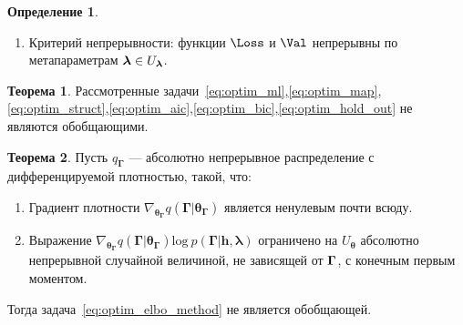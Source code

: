 \documentclass[11pt, a5paper]{dissert}
\theoremstyle{definition}
\newtheorem{theorem}{Теорема}
\newtheorem{defin}{Определение}
\begin{document}
{\begin{defin}
\begin{enumerate}
\item Критерий непрерывности: функции $\Loss$ и $\Val$ непрерывны по метапараметрам $\boldsymbol{\lambda} \in U_{\boldsymbol{\lambda}}$.
\end{enumerate}
\end{defin}

\begin{theorem}Рассмотренные задачи~\eqref{eq:optim_ml},\eqref{eq:optim_map},\eqref{eq:optim_struct},\eqref{eq:optim_aic},\eqref{eq:optim_bic},\eqref{eq:optim_hold_out} не являются обобщающими.
\end{theorem}

\begin{theorem}
Пусть $q_{\boldsymbol{\Gamma}}$ --- абсолютно непрерывное распределение с дифференцируемой плотностью, такой, что:
\begin{enumerate}
\item Градиент плотности $\nabla_{\boldsymbol{\theta}_{\boldsymbol{\Gamma}}} q(\boldsymbol{\Gamma}|\boldsymbol{\theta}_{\boldsymbol{\Gamma}})$ является ненулевым почти всюду.
\item Выражение $\nabla_{\boldsymbol{\theta}_{\boldsymbol{\Gamma}}} q(\boldsymbol{\Gamma}|\boldsymbol{\theta}_{\boldsymbol{\Gamma}}) \text{log}~p(\boldsymbol{\Gamma}|\mathbf{h}, \boldsymbol{\lambda})$ ограничено на $U_{\boldsymbol{\theta}}$ абсолютно непрерывной случайной величиной, не зависящей от $\boldsymbol{\Gamma}$, с конечным первым моментом.
\end{enumerate}
Тогда задача~\eqref{eq:optim_elbo_method} не является обобщающей.
\end{theorem}


}
\end{document}
